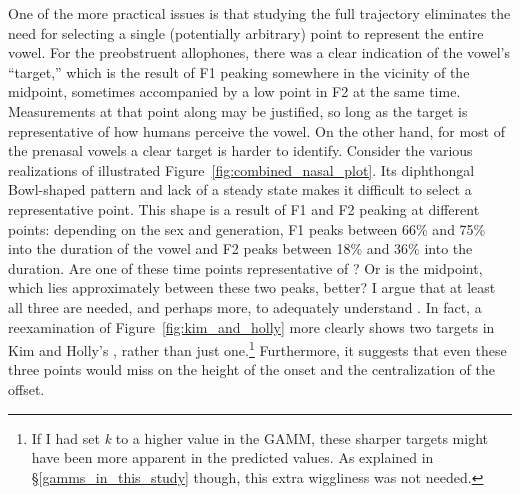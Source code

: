 One of the more practical issues is that studying the full trajectory eliminates the need for selecting a single (potentially arbitrary) point to represent the entire vowel. For the preobstruent allophones, there was a clear indication of the vowel's ``target,'' which is the result of F1 peaking somewhere in the vicinity of the midpoint, sometimes accompanied by a low point in F2 at the same time. Measurements at that point along may be justified, so long as the target is representative of how humans perceive the vowel. On the other hand, for most of the prenasal vowels a clear target is harder to identify. Consider the various realizations of \ban illustrated Figure~\ref{fig:combined_nasal_plot}. Its diphthongal Bowl-shaped pattern and lack of a steady state makes it difficult to select a representative point. This shape is a result of F1 and F2 peaking at different points: depending on the sex and generation, F1 peaks between 66\% and 75\% into the duration of the vowel and F2 peaks between 18\% and 36\% into the duration. Are one of these time points representative of \ban? Or is the midpoint, which lies approximately between these two peaks, better? I argue that at least all three are needed, and perhaps more, to adequately understand \ban. In fact, a reexamination of Figure~\ref{fig:kim_and_holly} more clearly shows two targets in Kim and Holly's \ban, rather than just one.\footnote{If I had set \textit{k} to a higher value in the GAMM, these sharper targets might have been more apparent in the predicted values. As explained in \S\ref{gamms_in_this_study} though, this extra wiggliness was not needed.} Furthermore, it suggests that even these three points would miss on the height of the onset and the centralization of the offset.

